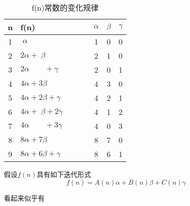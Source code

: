\documentclass[mode=geye]{elegantnote}
\begin{document}
\begin{table}[htbp]
	\centering
	\small
	\caption{f(n)常数的变化规律}
	\begin{tabular}{c|lcccc}
	\toprule
	n & f(n) & $ \qquad $ & $ \alpha $ & $ \beta $ & $ \gamma $ \\
	\midrule
	1 & $ \;\alpha $                    && 1& 0 &0 \\
	2 & $ 2\alpha + \;\beta $           && 2& 1 &0 \\
	3 & $ 2\alpha \qquad + \gamma $     && 2& 0 &1 \\ 
	4 & $ 4\alpha + 3\beta $            && 4& 3 &0 \\ 
	5 & $ 4\alpha + 2\beta  + \gamma $  && 4& 2 &1 \\ 
	6 & $ 4\alpha + \;\beta + 2\gamma $ && 4& 1 &2 \\ 
	7 & $ 4\alpha \qquad + 3\gamma $    && 4& 0 &3 \\ 
	8 & $ 8\alpha + 7\beta $            && 8& 7 &0 \\ 
	9 & $ 8\alpha + 6\beta + \gamma $   && 8& 6 &1 \\ 
	\bottomrule
\end{tabular}%
	\label{tab:fnLists}%
\end{table}%

假设$ f(n) $具有如下迭代形式
\begin{equation}\label{fnReccu}
	f(n) = A(n)\alpha + B(n)\beta + C(n)\gamma
\end{equation}

看起来似乎有
\end{document}
